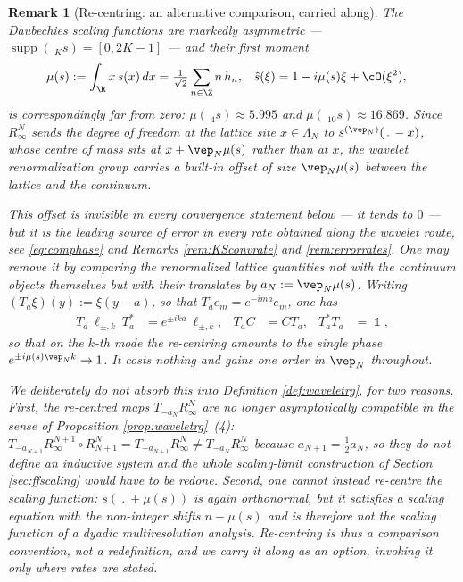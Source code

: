 \documentclass[a4paper, 11pt]{article}
\DeclareMathOperator{\1}{\mathds{1}}
\DeclareMathOperator{\supp}{supp}
\newtheorem{rem}[thm]{Remark}
\begin{document}
\begin{rem}[Re-centring: an alternative comparison, carried along]
\label{rem:recentring}
The Daubechies scaling functions are markedly asymmetric --- $\supp(\!\ _{K}s) = [0,2K-1]$ --- and their first moment
\begin{align}
\label{eq:comdef}
\mu(s) & := \int_{\R}x\!\ s(x)\!\ dx = \tfrac{1}{\sqrt{2}}\sum_{n\in\Z}n\!\ h_{n}, & \hat{s}(\xi) & = 1-i\mu(s)\xi+\cO(\xi^{2}),
\end{align}
is correspondingly far from zero: $\mu(\!\ _{4}s)\approx5.995$ and $\mu(\!\ _{10}s)\approx16.869$. Since $R^{N}_{\infty}$ sends the degree of freedom at the lattice site $x\in\Lambda_{N}$ to $s^{(\vep_{N})}(\!\ .\!\ -x)$, whose centre of mass sits at $x+\vep_{N}\mu(s)$ rather than at $x$, the wavelet renormalization group carries a built-in offset of size $\vep_{N}\mu(s)$ between the lattice and the continuum.

This offset is invisible in every convergence statement below --- it tends to $0$ --- but it is the leading source of error in every \emph{rate} obtained along the wavelet route, see \eqref{eq:comphase} and Remarks \ref{rem:KSconvrate} and \ref{rem:errorrates}. One may remove it by comparing the renormalized lattice quantities not with the continuum objects themselves but with their translates by $a_{N}:=\vep_{N}\mu(s)$. Writing $(T_{a}\xi)(y):=\xi(y-a)$, so that $T_{a}e_{m}=e^{-ima}e_{m}$, one has
\begin{align}
\label{eq:recentringphase}
T_{a}\!\ \ell_{\pm,k}\!\ T_{a}^{*} & = e^{\pm ika}\!\ \ell_{\pm,k}, & T_{a}C & = CT_{a}, & T_{a}^{*}T_{a} & = \1,
\end{align}
so that on the $k$-th mode the re-centring amounts to the single phase $e^{\pm i\mu(s)\vep_{N}k}\rightarrow1$. It costs nothing and gains one order in $\vep_{N}$ throughout.

We deliberately do \emph{not} absorb this into Definition \ref{def:waveletrg}, for two reasons. First, the re-centred maps $T_{-a_{N}}R^{N}_{\infty}$ are no longer asymptotically compatible in the sense of Proposition \ref{prop:waveletrg}\!\ (4): $T_{-a_{N+1}}R^{N+1}_{\infty}\circ R^{N}_{N+1} = T_{-a_{N+1}}R^{N}_{\infty}\neq T_{-a_{N}}R^{N}_{\infty}$ because $a_{N+1}=\tfrac{1}{2}a_{N}$, so they do not define an inductive system and the whole scaling-limit construction of Section \ref{sec:ffscaling} would have to be redone. Second, one cannot instead re-centre the scaling function: $s(\!\ .\!\ +\mu(s))$ is again orthonormal, but it satisfies a scaling equation with the non-integer shifts $n-\mu(s)$ and is therefore not the scaling function of a dyadic multiresolution analysis. Re-centring is thus a \emph{comparison convention}, not a redefinition, and we carry it along as an option, invoking it only where rates are stated.


\end{rem}
\end{document}
